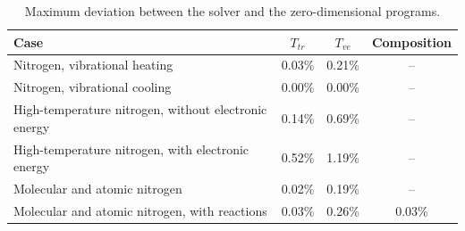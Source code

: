 \begin{table}[H]
  \centering
  \caption{Maximum deviation between the solver and the zero-dimensional
  programs.}
  \label{tab:solver}
  \small
  \begin{tabular}{lccc}
    \toprule
    Case & $T_{tr}$ & $T_{ve}$ & Composition \\
    \midrule
    Nitrogen, vibrational heating                    & 0.03\% & 0.21\% & -- \\
    Nitrogen, vibrational cooling                    & 0.00\% & 0.00\% & -- \\
    High-temperature nitrogen, without electronic energy & 0.14\% & 0.69\% & -- \\
    High-temperature nitrogen, with electronic energy    & 0.52\% & 1.19\% & -- \\
    Molecular and atomic nitrogen                    & 0.02\% & 0.19\% & -- \\
    Molecular and atomic nitrogen, with reactions    & 0.03\% & 0.26\% & 0.03\% \\
    \bottomrule
  \end{tabular}
\end{table}
